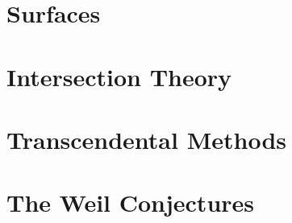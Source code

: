 \chapter{Surfaces}
\label{chap:hartshorne-surfaces}

\appendix
\chapter{Intersection Theory}
\label{app:hartshorne-intersection}

\chapter{Transcendental Methods}
\label{app:hartshorne-transcendental}

\chapter{The Weil Conjectures}
\label{app:hartshorne-weil}

